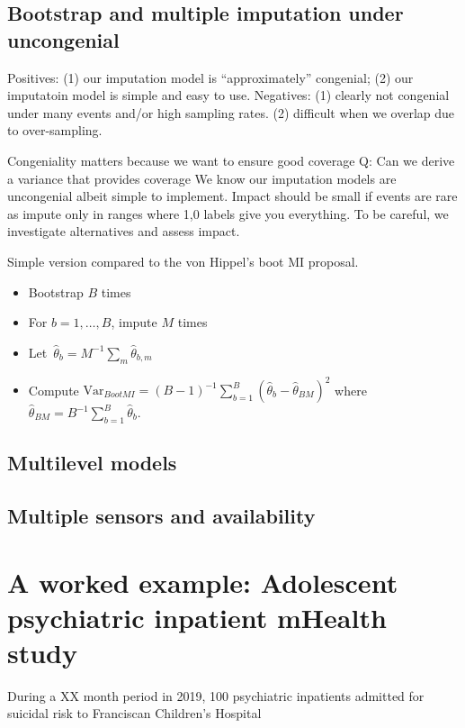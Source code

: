 \documentclass[11pt]{amsart}
\begin{document}
\subsection{Bootstrap and multiple imputation under uncongenial }

Positives: (1) our imputation model is ``approximately'' congenial; (2) our imputatoin model is simple and easy to use.
Negatives: (1) clearly not congenial under many events and/or high sampling rates. (2) difficult when we overlap due to over-sampling.

Congeniality matters because we want to ensure good coverage
Q: Can we derive a variance that provides coverage
We know our imputation models are uncongenial albeit simple to implement.  Impact should be small if events are rare as impute only in ranges where 1,0 labels give you everything.  To be careful, we investigate alternatives and assess impact.

Simple version compared to the von Hippel's boot MI proposal.
\begin{itemize}
\item Bootstrap $B$ times
\item For $b = 1, \ldots, B$, impute $M$ times
\item Let~$\hat \theta_b = M^{-1} \sum_m \hat \theta_{b,m}$
\item Compute $\text{Var}_{BootMI} = (B-1)^{-1} \sum_{b=1}^B (\hat \theta_b - \hat \theta_{BM})^2$ where $\hat \theta_{BM} = B^{-1} \sum_{b=1}^B \hat \theta_b$.
\end{itemize}



\newpage

\subsection{Multilevel models}

\subsection{Multiple sensors and availability}

\section{A worked example: Adolescent psychiatric inpatient mHealth study} \label{section:example}

During a XX month period in 2019, 100 psychiatric inpatients admitted
for suicidal risk to Franciscan Children's Hospital
\end{document}
